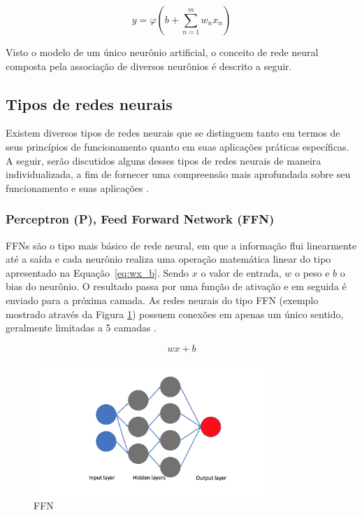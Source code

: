 \begin{equation}
    y = \varphi \left( b + \sum_{n=1}^{m} w_n x_n \right)
    \label{eq:neuronio}
\end{equation}

Visto o modelo de um único neurônio artificial, o conceito de rede neural composta pela associação de diversos neurônios é descrito a seguir.

\subsection{Tipos de redes neurais}

Existem diversos tipos de redes neurais que se distinguem tanto em termos de seus princípios de funcionamento quanto em suas aplicações práticas específicas. A seguir, serão discutidos alguns desses tipos de redes neurais de maneira individualizada, a fim de fornecer uma compreensão mais aprofundada sobre seu funcionamento e suas aplicações \cite{alex2020}.

\subsubsection{Perceptron (P), Feed Forward Network (FFN)}

FFNs são o tipo mais básico de rede neural, em que a informação flui linearmente até a saída e cada neurônio realiza uma operação matemática linear do tipo apresentado na Equação~\ref{eq:wx_b}. Sendo $x$ o valor de entrada, $w$ o peso e $b$ o bias do neurônio. O resultado passa por uma função de ativação e em seguida é enviado para a próxima camada. As redes neurais do tipo FFN (exemplo mostrado através da Figura \ref{fig:ffn}) possuem conexões em apenas um único sentido, geralmente limitadas a 5 camadas \cite{alex2020}.

\begin{equation}
    wx + b
    \label{eq:wx_b}
\end{equation}

\begin{figure}[H]
    \centering
    \caption{\label{fig:ffn}FFN}
    \includegraphics[width=0.8\textwidth]{img/revisao_bibliografica/ffn.png}
\end{figure}

